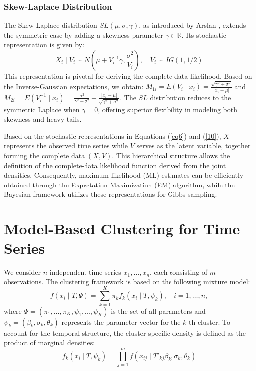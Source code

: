 \documentclass[twoside]{article}
\begin{document}
\subsubsection{Skew-Laplace Distribution}
The Skew-Laplace distribution $SL(\mu, \sigma, \gamma)$, as introduced by Arslan \citep{arslan2009}, extends the symmetric case by adding a skewness parameter $\gamma \in \mathbb{R}$. Its stochastic representation is given by:
\begin{equation}\label{10}
X_i \mid V_i \sim N\left(\mu + V_i^{-1}\gamma, \frac{\sigma^2}{V_i}\right), \quad V_i \sim IG(1, 1/2)
\end{equation}
This representation is pivotal for deriving the complete-data likelihood. Based on the Inverse-Gaussian expectations, we obtain:
$M_{1i} = E(V_i \mid x_i) = \frac{\sqrt{\gamma^2+\sigma^2}}{|x_i-\mu|}$ and $M_{2i} = E(V_i^{-1} \mid x_i) = \frac{\sigma^2}{\gamma^2+\sigma^2} + \frac{|x_i-\mu|}{\sqrt{\gamma^2+\sigma^2}}$.
The $SL$ distribution reduces to the symmetric Laplace when $\gamma=0$, offering superior flexibility in modeling both skewness and heavy tails.

Based on the stochastic representations in Equations (\ref{eq6}) and (\ref{10}), $X$ represents the observed time series while $V$ serves as the latent variable, together forming the complete data $(X, V)$. This hierarchical structure allows the definition of the complete-data likelihood function derived from the joint densities. Consequently, maximum likelihood (ML) estimates can be efficiently obtained through the Expectation-Maximization (EM) algorithm, while the Bayesian framework utilizes these representations for Gibbs sampling.

\section{Model-Based Clustering for Time Series}

We consider $n$ independent time series $x_1, \dots, x_n$, each consisting of $m$ observations. The clustering framework is based on the following mixture model:
\begin{equation}\label{mix_model}
f(x_i \mid T, \Psi) = \sum_{k=1}^K \pi_k f_k(x_i \mid T, \psi_k), \quad i=1, \dots, n,
\end{equation}
where $\Psi = (\pi_1, \dots, \pi_K, \psi_1, \dots, \psi_K)$ is the set of all parameters and $\psi_k = (\beta_k, \sigma_k, \theta_k)$ represents the parameter vector for the $k$-th cluster. To account for the temporal structure, the cluster-specific density is defined as the product of marginal densities:
\begin{equation}\label{ts_density}
f_k(x_i \mid T, \psi_k) = \prod_{j=1}^m f(x_{ij} \mid T'_{kj} \beta_k, \sigma_k, \theta_k)
\end{equation}
\end{document}
